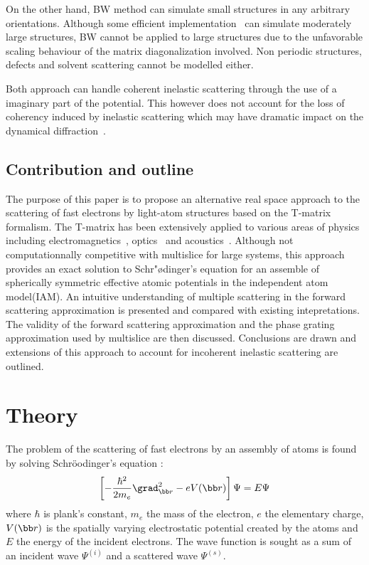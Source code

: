 On the other hand, BW method can simulate small structures in any arbitrary
orientations. Although some efficient implementation~\cite{Zuo1995} can simulate
moderately large structures, BW cannot be applied to large structures due to
the unfavorable scaling behaviour of the matrix diagonalization involved.
Non periodic structures, defects and solvent scattering cannot be modelled either.

Both approach can handle coherent inelastic scattering through the use of
a imaginary part of the potential. This however does not account for the
loss of coherency induced by inelastic scattering which may have dramatic
impact on the dynamical diffraction~\cite{Latychevskaia2019}.


\subsection{Contribution and outline}

The purpose of this paper is to propose an alternative real space approach
to the scattering of fast electrons by light-atom structures based on
the T-matrix formalism.
The T-matrix has been extensively applied to various areas of physics including
electromagnetics~\cite{Hamid1990,Hamid1990_b,Eremin1995}, optics~\cite{Moine2005}
and acoustics~\cite{Silva2012,Godin2011}.
Although not computationnally competitive with multislice
for large systems, this approach provides an exact solution to Schr{"\o}dinger's
equation for an assemble of spherically symmetric effective atomic potentials in
the independent atom model(IAM).
An intuitive understanding of multiple scattering in the forward scattering
approximation is presented and compared with existing intepretations.
The validity of the forward scattering approximation and the phase grating
approximation used by multislice are then discussed.
Conclusions are drawn and extensions of this approach to account for incoherent
inelastic scattering are outlined.



\section{Theory}

The problem of the scattering of fast electrons by an assembly of atoms is
found by solving Schr\"{o}odinger's equation :
%
\begin{equation}\label{eq:schro}
  \left[-\frac{\hbar^2}{2m_e}\grad_{\bb r}^2 - eV(\bb r) \right] \Psi = E\Psi
\end{equation}
%
where $\hbar$ is plank's constant, $m_e$ the mass of the electron,
$e$ the elementary charge, $V(\bb r)$ is the spatially varying electrostatic
potential created by the atoms and $E$ the energy of the incident electrons.
The wave function is sought as a sum of an incident wave $\Psi^{(i)}$
and a scattered wave $\Psi^{(s)}$.

